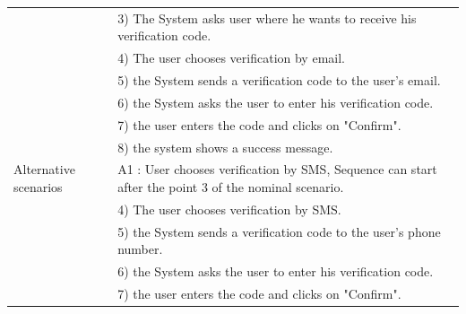 \documentclass[]{uc2pfecaneva}
\begin{document}
\begin{table}
\begin{tabularx}{\textwidth}{|l|X|}
            & 3) The System asks user where he wants to receive his verification code.                                                                                             \\
            & 4) The user chooses verification by email.                                                                                                                           \\
            & 5) the System sends a verification code to the user's email.                                                                                                         \\
            & 6) the System asks the user to enter his verification code.                                                                                                          \\
            & 7) the user enters the code and clicks on "Confirm".                                                                                                                 \\
            & 8) the system shows a success message.                                                                                                                               \\ \hline
            Alternative scenarios
            & A1 : User chooses verification by SMS,  Sequence can start after the point 3 of the nominal scenario.                                                                \\
            & \hspace{4mm}4) The user chooses verification by SMS.                                                                                                               \\
            & \hspace{4mm}5) the System sends a verification code to the user's phone number.                                                                                    \\
            & \hspace{4mm}6) the System asks the user to enter his verification code.                                                                                            \\
            & \hspace{4mm}7) the user enters the code and clicks on "Confirm".                                                                                                   \\

\end{tabularx}
\end{table}
\end{document}
